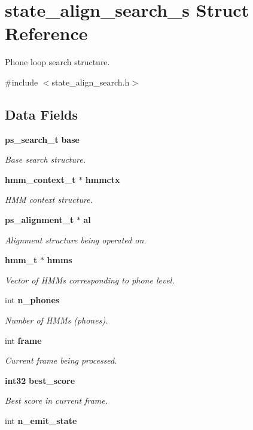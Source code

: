 \section{state\-\_\-align\-\_\-search\-\_\-s \-Struct \-Reference}
\label{structstate__align__search__s}


\-Phone loop search structure.  




{\ttfamily \#include $<$state\-\_\-align\-\_\-search.\-h$>$}

\subsection*{\-Data \-Fields}
\begin{DoxyCompactItemize}
\item 
{\bf ps\-\_\-search\-\_\-t} {\bf base}
\begin{DoxyCompactList}\small\item\em \-Base search structure. \end{DoxyCompactList}\item 
{\bf hmm\-\_\-context\-\_\-t} $\ast$ {\bf hmmctx}
\begin{DoxyCompactList}\small\item\em \-H\-M\-M context structure. \end{DoxyCompactList}\item 
{\bf ps\-\_\-alignment\-\_\-t} $\ast$ {\bf al}
\begin{DoxyCompactList}\small\item\em \-Alignment structure being operated on. \end{DoxyCompactList}\item 
{\bf hmm\-\_\-t} $\ast$ {\bf hmms}
\begin{DoxyCompactList}\small\item\em \-Vector of \-H\-M\-Ms corresponding to phone level. \end{DoxyCompactList}\item 
int {\bf n\-\_\-phones}
\begin{DoxyCompactList}\small\item\em \-Number of \-H\-M\-Ms (phones). \end{DoxyCompactList}\item 
int {\bf frame}
\begin{DoxyCompactList}\small\item\em \-Current frame being processed. \end{DoxyCompactList}\item 
{\bf int32} {\bf best\-\_\-score}
\begin{DoxyCompactList}\small\item\em \-Best score in current frame. \end{DoxyCompactList}\item 
int {\bf n\-\_\-emit\-\_\-state}\label{structstate__align__search__s_a80c74bac917a8203bb74f5738621ce83}


\end{DoxyCompactItemize}
